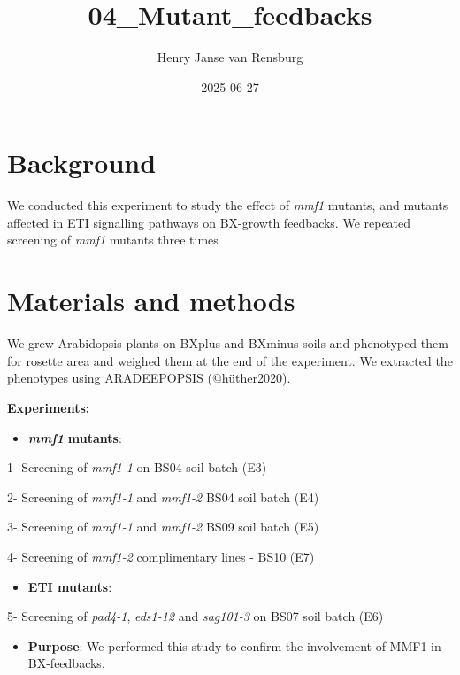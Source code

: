 \documentclass[
  10pt,
]{article}
\title{04\_Mutant\_feedbacks}
\author{Henry Janse van Rensburg}
\date{2025-06-27}
\providecommand{\tightlist}{%
  \setlength{\itemsep}{0pt}\setlength{\parskip}{0pt}}\usepackage{longtable,booktabs,array}
\renewcommand*\contentsname{Table of contents}
\newcommand\contentsname{Table of contents}
\begin{document}
\maketitle

\renewcommand*\contentsname{Table of contents}
{
\hypersetup{linkcolor=}
\setcounter{tocdepth}{2}
\tableofcontents
}

\section{Background}\label{background}

We conducted this experiment to study the effect of \emph{mmf1} mutants,
and mutants affected in ETI signalling pathways on BX-growth feedbacks.
We repeated screening of \emph{mmf1} mutants three times

\section{Materials and methods}\label{materials-and-methods}

We grew Arabidopsis plants on BXplus and BXminus soils and phenotyped
them for rosette area and weighed them at the end of the experiment. We
extracted the phenotypes using ARADEEPOPSIS (@hüther2020).

\textbf{Experiments:}

\begin{itemize}
\tightlist
\item
  \textbf{\emph{mmf1}} \textbf{mutants}:
\end{itemize}

1- Screening of \emph{mmf1-1} on BS04 soil batch (E3)

2- Screening of \emph{mmf1-1} and \emph{mmf1-2} BS04 soil batch (E4)

3- Screening of \emph{mmf1-1} and \emph{mmf1-2} BS09 soil batch (E5)

4- Screening of \emph{mmf1-2} complimentary lines - BS10 (E7)

\begin{itemize}
\tightlist
\item
  \textbf{ETI mutants}:
\end{itemize}

5- Screening of \emph{pad4-1}, \emph{eds1-12} and \emph{sag101-3} on
BS07 soil batch (E6)

\begin{itemize}
\tightlist
\item
  \textbf{Purpose}: We performed this study to confirm the involvement
  of MMF1 in BX-feedbacks.
\end{itemize}
\end{document}
